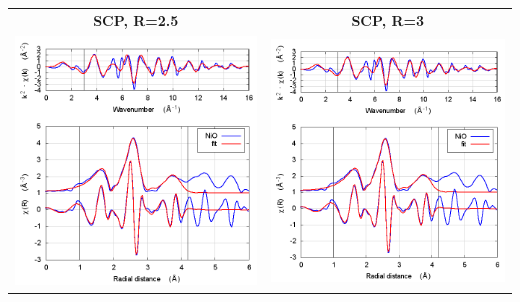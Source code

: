 \documentclass[11pt]{article}
\begin{document}
\begin{center}
  \begin{tabular}{cc}
    \textbf{SCP, R=2.5} & \textbf{SCP, R=3} \\
    \includegraphics[width=.45\linewidth]{NiO/scf/fit_withSCF_2.5.png} & 
    \includegraphics[width=.45\linewidth]{NiO/scf/fit_withSCF_3.png} \\
  \end{tabular}
\end{center}
\end{document}
